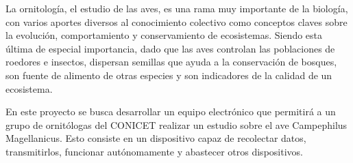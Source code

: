 La ornitología, el estudio de las aves, es una rama muy importante de la biología, con varios aportes diversos al conocimiento colectivo como conceptos claves sobre la evolución, comportamiento y conservamiento de ecosistemas. Siendo esta última de especial importancia, dado que las aves controlan las poblaciones de roedores e insectos, dispersan semillas que ayuda a la conservación de bosques, son fuente de alimento de otras especies y son indicadores de la calidad de un ecosistema.


En este proyecto se busca desarrollar un equipo electrónico que permitirá a un grupo de ornitólogas del CONICET realizar un estudio sobre el ave Campephilus Magellanicus. Esto consiste en un dispositivo capaz de recolectar datos, transmitirlos, funcionar autónomamente y abastecer otros dispositivos.